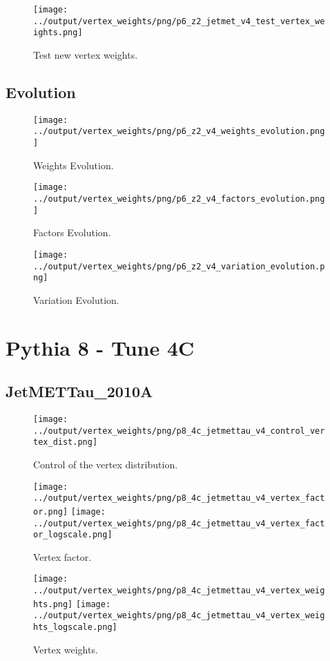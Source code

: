 \documentclass[11pt]{book}
\begin{document}
\begin{figure}[ht]
\centering
\texttt{[image: ../output/vertex\_weights/png/p6\_z2\_jetmet\_v4\_test\_vertex\_weights.png]}
\caption{Test new vertex weights.}
\end{figure}
\clearpage

\subsection{Evolution}
\begin{figure}[ht]
\centering
\texttt{[image: ../output/vertex\_weights/png/p6\_z2\_v4\_weights\_evolution.png]}
\caption{Weights Evolution.}
\end{figure}


\begin{figure}[ht]
\centering
\texttt{[image: ../output/vertex\_weights/png/p6\_z2\_v4\_factors\_evolution.png]}
\caption{Factors Evolution.}
\end{figure}

\begin{figure}[ht]
\centering
\texttt{[image: ../output/vertex\_weights/png/p6\_z2\_v4\_variation\_evolution.png]}
\caption{Variation Evolution.}
\end{figure}
\clearpage

\section{Pythia 8 - Tune 4C}
\subsection{JetMETTau\_2010A}
\begin{figure}[ht]
\centering
\texttt{[image: ../output/vertex\_weights/png/p8\_4c\_jetmettau\_v4\_control\_vertex\_dist.png]}
\caption{Control of the vertex distribution.}
\end{figure}

\begin{figure}[ht]
\centering
\texttt{[image: ../output/vertex\_weights/png/p8\_4c\_jetmettau\_v4\_vertex\_factor.png]}
\texttt{[image: ../output/vertex\_weights/png/p8\_4c\_jetmettau\_v4\_vertex\_factor\_logscale.png]}
\caption{Vertex factor.}
\end{figure}

\begin{figure}[ht]
\centering
\texttt{[image: ../output/vertex\_weights/png/p8\_4c\_jetmettau\_v4\_vertex\_weights.png]}
\texttt{[image: ../output/vertex\_weights/png/p8\_4c\_jetmettau\_v4\_vertex\_weights\_logscale.png]}
\caption{Vertex weights.}
\end{figure}
\end{document}
